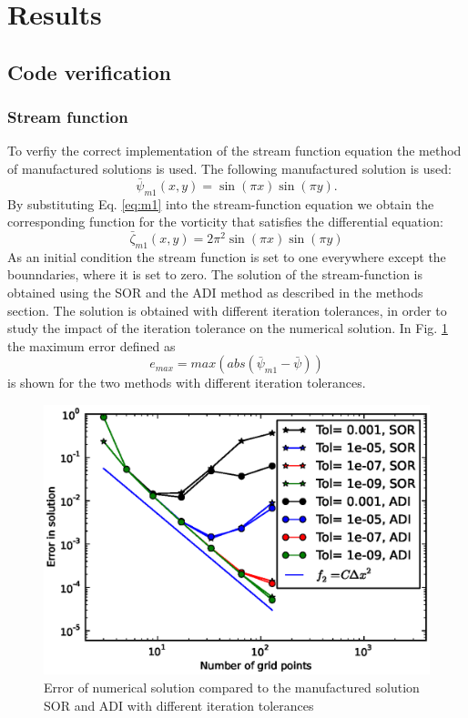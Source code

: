 \section{Results}
\subsection{Code verification}
\subsubsection{Stream function}
To verfiy the correct implementation of the stream function equation the method of manufactured solutions is used. The following manufactured solution is used:
\begin{equation}
\bar{\psi}_{m1}(x,y) = \sin(\pi x) \sin(\pi y).
\label{eq:m1}
\end{equation}
By substituting Eq. \ref{eq:m1} into the stream-function equation we obtain the corresponding function for the vorticity that satisfies the differential equation:
\begin{equation}
\bar{\zeta}_{m1}(x,y) = 2 \pi^2 \sin(\pi x) \sin(\pi y) 
\end{equation}
As an initial condition the stream function is set to one everywhere except the bounndaries, where it is set to zero. The solution of the stream-function is obtained using the SOR and the ADI method as described in the methods section. The solution is obtained with different iteration tolerances, in order to study the impact of the iteration tolerance on the numerical solution.
In Fig. \ref{fig:code_verification_sf} the maximum error defined as 
\begin{equation}
e_{max} = max(abs(\bar{\psi}_{m1} - \bar{\psi}))
\end{equation}
is shown for the two methods with different iteration tolerances.
%
\begin{figure}[H]
\centering
\includegraphics[scale=0.8]{"figs/code_verification_tol"}
\caption{Error of numerical solution compared to the manufactured solution SOR and ADI with different iteration tolerances}
\label{fig:code_verification_sf}
\end{figure}
